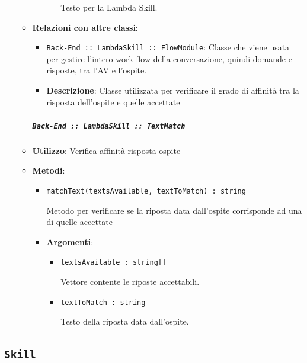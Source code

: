 \documentclass[../DefinizioneDiProdotto.tex]{subfiles}
\begin{document}
\begin{itemize}
\begin{itemize}
\begin{itemize}
\begin{itemize}
	 Testo per la Lambda Skill.
	\end{itemize}
	\end{itemize}\vspace{0.5em}
	\item \textbf{Relazioni con altre classi}:
	\begin{itemize}
	\item \texttt{Back-End :: LambdaSkill :: FlowModule}: Classe che viene usata per gestire l'intero work-flow della conversazione, quindi domande e risposte, tra l'AV e l'ospite.
	\end{itemize}
	\begin{itemize}\item \textbf{Descrizione}: Classe utilizzata per verificare il grado di affinità tra la risposta dell'ospite e quelle accettate
	\end{itemize}\subparagraph{\texttt{Back-End :: LambdaSkill :: TextMatch}}
	\item \textbf{Utilizzo}: Verifica affinità risposta ospite
	\item \textbf{Metodi}:
	\begin{itemize}
	\item \texttt{matchText(textsAvailable, textToMatch) : string}\

	 Metodo per verificare se la riposta data dall'ospite corrisponde ad una di quelle accettate

	\item \textbf{Argomenti}:
	\begin{itemize}
	\item \texttt{textsAvailable : string[]}\

	 Vettore contente le riposte accettabili.
	\item \texttt{textToMatch : string}\

	 Testo della riposta data dall'ospite.
	\end{itemize}
	\end{itemize}\vspace{0.5em}
	\end{itemize}\end{itemize}


\subsection{ \texttt{Skill}}
\end{document}
